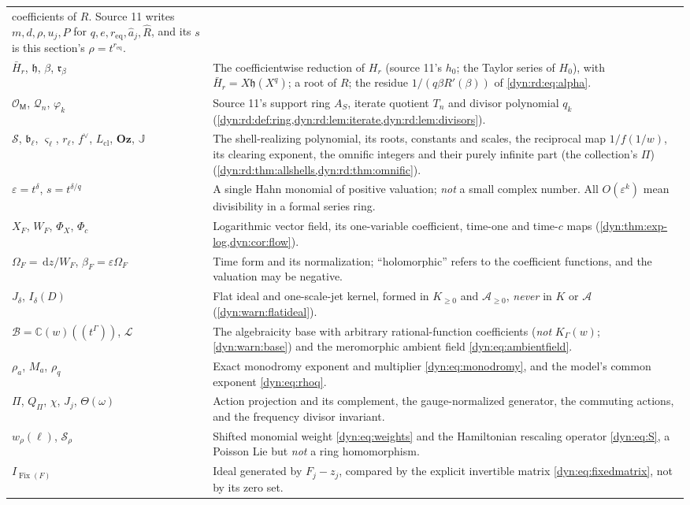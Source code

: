 \documentclass[11pt,letterpaper]{article}
\theoremstyle{definition}
\theoremstyle{remark}
\newcommand{\C}{\mathbb C}
\newcommand{\OO}{\mathcal O}
\newcommand{\AAA}{\mathscr A}
\newcommand{\BB}{\mathscr B}
\newcommand{\LL}{\mathscr L}
\newcommand{\Fix}{\operatorname{Fix}}
\newcommand{\eps}{\varepsilon}
\newcommand{\dd}{\,\mathrm d}
\newcommand{\Oz}{\mathbf{Oz}}
\numberwithin{equation}{section}
\begin{document}
\begin{longtable}{@{}P{0.22\textwidth}P{0.71\textwidth}@{}}
coefficients of $R$. Source 11 writes $m,d,\rho,u_j,P$ for $q,e,r_{\mathrm{eq}},\hat a_j,\widehat R$,
and its $s$ is this section's $\rho=t^{r_{\mathrm{eq}}}$.\\[3pt]
$\bar H_r$, $\mathfrak h$, $\beta$, $\mathfrak r_\beta$ & The coefficientwise
reduction of $H_r$ (source 11's $h_0$; the Taylor series of $H_0$), with
$\bar H_r=X\mathfrak h(X^{q})$; a root of $R$; the residue
$1/(q\beta R'(\beta))$ of \eqref{dyn:rd:eq:alpha}.\\[3pt]
$\OO_{\mathsf M}$, $\mathcal Q_n$, $\varphi_k$ & Source 11's support ring
$A_S$, iterate quotient $T_n$ and divisor polynomial $q_k$
(\cref{dyn:rd:def:ring,dyn:rd:lem:iterate,dyn:rd:lem:divisors}).\\[3pt]
$\mathcal S$, $\mathfrak b_\ell$, $\varsigma_\ell$, $r_\ell$, $f^{\vee}$,
$L_{\mathrm{cl}}$, $\Oz$, $\mathbb J$ & The shell-realizing polynomial, its
roots, constants and scales, the reciprocal map $1/f(1/w)$, its clearing
exponent, the omnific integers and their purely infinite part (the
collection's $\Pi$) (\cref{dyn:rd:thm:allshells,dyn:rd:thm:omnific}).\\[3pt]
$\eps=t^{\delta}$, $s=t^{\delta/q}$ & A single Hahn monomial of positive
valuation; \emph{not} a small complex number. All $O(\eps^{k})$ mean
divisibility in a formal series ring.\\[3pt]
$X_F$, $W_F$, $\Phi_X$, $\Phi_c$ & Logarithmic vector field, its one-variable
coefficient, time-one and time-$c$ maps
(\cref{dyn:thm:exp-log,dyn:cor:flow}).\\[3pt]
$\Omega_F=\dd z/W_F$, $\beta_F=\eps\Omega_F$ & Time form and its
normalization; ``holomorphic'' refers to the coefficient functions, and the
valuation may be negative.\\[3pt]
$J_\delta$, $I_\delta(D)$ & Flat ideal and one-scale-jet kernel, formed in
$K_{\ge0}$ and $\AAA_{\ge0}$, \emph{never} in $K$ or $\AAA$
(\cref{dyn:warn:flatideal}).\\[3pt]
$\BB=\C(w)((t^{\Gamma}))$, $\LL$ & The algebraicity base with arbitrary
rational-function coefficients (\emph{not} $K_\Gamma(w)$;
\cref{dyn:warn:base}) and the meromorphic ambient field
\eqref{dyn:eq:ambientfield}.\\[3pt]
$\rho_a$, $M_a$, $\rho_q$ & Exact monodromy exponent and multiplier
\eqref{dyn:eq:monodromy}, and the model's common exponent
\eqref{dyn:eq:rhoq}.\\[3pt]
$\Pi$, $Q_\Pi$, $\chi$, $J_j$, $\Theta(\omega)$ & Action projection and its
complement, the gauge-normalized generator, the commuting actions, and the
frequency divisor invariant.\\[3pt]
$w_\rho(\ell)$, $\mathscr S_\rho$ & Shifted monomial weight
\eqref{dyn:eq:weights} and the Hamiltonian rescaling operator
\eqref{dyn:eq:S}, a Poisson Lie but \emph{not} a ring homomorphism.\\[3pt]
$I_{\Fix(F)}$ & Ideal generated by $F_j-z_j$, compared by the explicit
invertible matrix \eqref{dyn:eq:fixedmatrix}, not by its zero set.\\
\bottomrule
\end{longtable}
\end{document}
